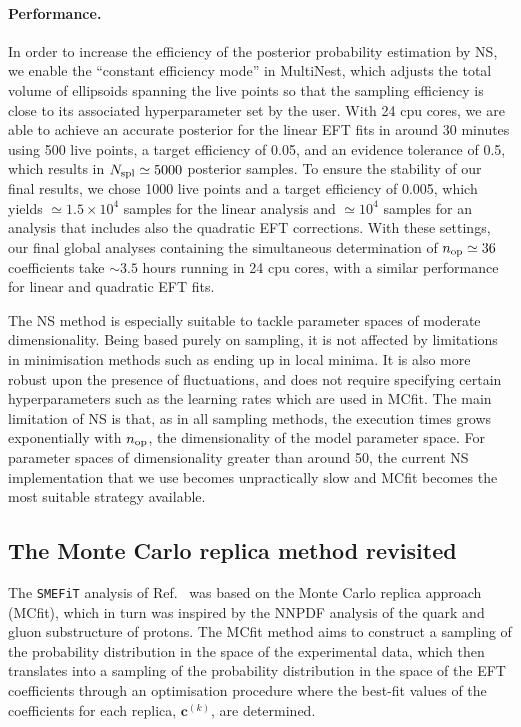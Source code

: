 \paragraph{Performance.}
%
In order to increase the efficiency of the posterior probability estimation by NS, we enable the
``constant efficiency mode'' in MultiNest, which adjusts the
total volume of ellipsoids spanning the live points so that the sampling
efficiency is close to its associated hyperparameter set by the user. 
%
With 24 cpu cores, 
we are able to achieve an accurate posterior for the linear EFT fits
in around 30 minutes using 500 live points, a target efficiency of 0.05, and
an evidence tolerance of 0.5, which results in $N_{\rm spl}\simeq 5000$ posterior samples.
%
To ensure the stability of our final results, we chose 
1000 live points and a target efficiency of 
0.005, which yields $\simeq$$1.5\times 10^4$ samples for the
linear analysis and $\simeq$$10^4$ samples for an analysis that includes also the quadratic EFT
corrections.
%
With these settings, our final global analyses containing the simultaneous
determination of $n_{\rm op}\simeq 36$ coefficients
take $\sim 3.5$ hours running in 24 cpu cores, with a similar performance for
linear and quadratic EFT fits.

The NS method is especially suitable to tackle parameter spaces of moderate dimensionality.
%
Being based purely on sampling, it is not affected by limitations in minimisation
methods such as ending up in local minima.
%
It is also more robust upon the presence of fluctuations, and does not
require specifying certain hyperparameters such as the learning rates which are used in MCfit.
%
The main limitation of NS is that, as in all sampling methods, the execution times
grows exponentially with $n_{\rm op}$, the dimensionality of the model parameter space.
%
For parameter spaces of dimensionality greater than around 50, 
the current NS implementation that we use
becomes unpractically slow and MCfit becomes the most suitable strategy available.

\subsection{The Monte Carlo replica method revisited}
\label{sec:mcfit}

The {\tt SMEFiT} analysis of Ref.~\cite{Hartland:2019bjb} was based
on the Monte Carlo replica approach (MCfit), which in turn was inspired by the
NNPDF analysis of the quark and gluon substructure of protons.
%
The MCfit method aims to construct a sampling of the probability
distribution in the space of the experimental data, which then translates 
into a sampling of the probability distribution in the space of the EFT 
coefficients through an optimisation procedure where the best-fit values
of the coefficients for each replica, $\boldsymbol{c}^{(k)}$,
are determined.

